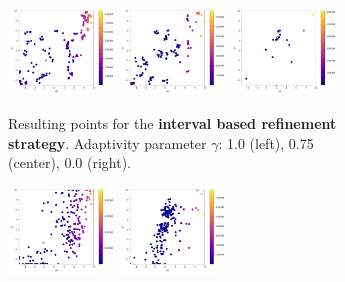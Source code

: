\begin{figure}[H]
	\begin{subfigure}{\textwidth}
		\centering
		\includegraphics[width=0.31\textwidth]{figures/Adaptive_random/Adaptivity_parameter/Alternative_0_adapt_1.0}
		\includegraphics[width=0.31\textwidth]{figures/Adaptive_random/Adaptivity_parameter/Alternative_0_adapt_0.75}
		\includegraphics[width=0.31\textwidth]{figures/Adaptive_random/Adaptivity_parameter/Alternative_0_adapt_0.0}
		\caption{ Resulting points for the \textbf{interval based refinement strategy}. Adaptivity parameter $ \gamma $: 1.0 (left), 0.75 (center), 0.0 (right). }
		\label{fig:alt0_adapt_param}
	\end{subfigure}
	\begin{subfigure}{\textwidth}
		\centering
		\includegraphics[width=0.31\textwidth]{figures/Adaptive_random/Adaptivity_parameter/Alternative_1_adapt_1.0_1_}
		\includegraphics[width=0.31\textwidth]{figures/Adaptive_random/Adaptivity_parameter/Alternative_1_adapt_0.75}

\end{subfigure}
\end{figure}
